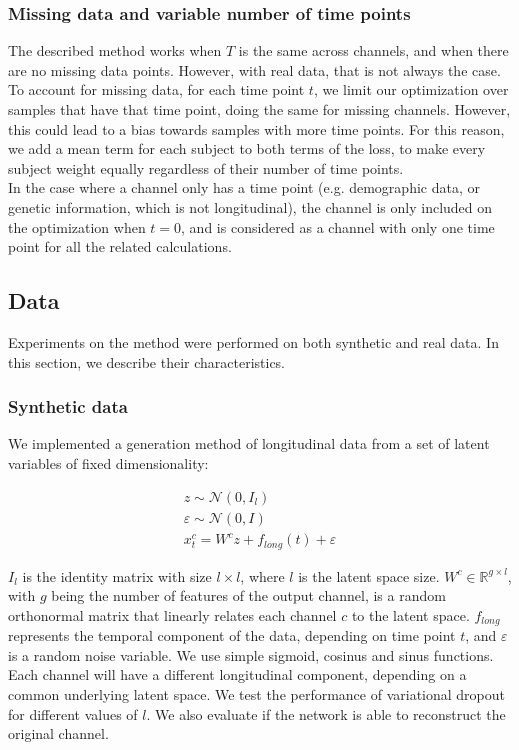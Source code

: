 \subsubsection{Missing data and variable number of time points}

The described method works when $T$ is the same across channels, and when there are no missing data points. However, with real data, that is not always the case. To account for missing data, for each time point $t$, we limit our optimization over samples that have that time point, doing the same for missing channels. However, this could lead to a bias towards samples with more time points. For this reason, we add a mean term for each subject to both terms of the loss, to make every subject weight equally regardless of their number of time points. \\

In the case where a channel only has a time point (e.g. demographic data, or genetic information, which is not longitudinal), the channel is only included on the optimization when $t=0$, and is considered as a channel with only one time point for all the related calculations.

\subsection{Data}

Experiments on the method were performed on both synthetic and real data. In this section, we describe their characteristics.

\subsubsection{Synthetic data}

We implemented a generation method of longitudinal data from a set of latent variables of fixed dimensionality:

\begin{equation} 
\begin{gathered} \label{rnn:eq:synthdata}
   z \sim \mathcal{N}(0, I_{l}) \\
   \varepsilon \sim \mathcal{N}(0, I) \\
   x^c_t = W^{c}z + f_{long}(t) + \varepsilon
\end{gathered}
\end{equation}

$I_{l}$ is the identity matrix with size $l \times l$, where $l$ is the latent space size. $W^c \in \mathbb{R}^{g \times l}$, with $g$ being the number of features of the output channel, is a random orthonormal matrix that linearly relates each channel $c$ to the latent space.  $f_{long}$ represents the temporal component of the data, depending on time point $t$, and $\varepsilon$ is a random noise variable. We use simple sigmoid, cosinus and sinus functions. Each channel will have a different longitudinal component, depending on a common underlying latent space. We test the performance of variational dropout for different values of $l$. We also evaluate if the network is able to reconstruct the original channel.   \\

